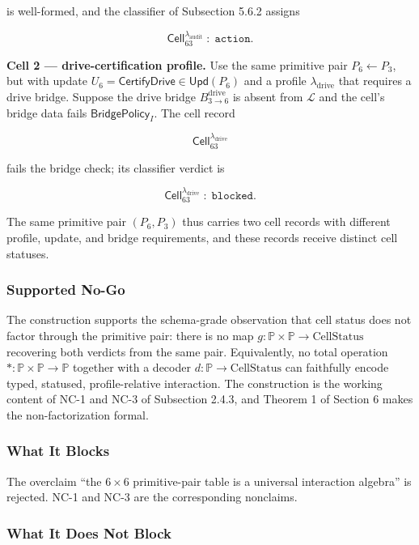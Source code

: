 \documentclass[11pt]{article}
\theoremstyle{definition}
\begin{document}
is well-formed, and the classifier of Subsection 5.6.2 assigns

\[
\mathsf{Cell}_{63}^{\lambda_{\mathrm{audit}}}\;:\;\texttt{action}.
\]

\textbf{Cell 2 --- drive-certification profile.} Use the same primitive pair \(P_6\leftarrow P_3\), but with update \(U_6=\mathsf{CertifyDrive}\in\mathsf{Upd}(P_6)\) and a profile \(\lambda_{\mathrm{drive}}\) that requires a drive bridge. Suppose the drive bridge \(B_{3\to 6}^{\mathrm{drive}}\) is absent from \(\mathcal L\) and the cell's bridge data fails \(\mathsf{BridgePolicy}_I\). The cell record

\[
\mathsf{Cell}_{63}^{\lambda_{\mathrm{drive}}}
\]

fails the bridge check; its classifier verdict is

\[
\mathsf{Cell}_{63}^{\lambda_{\mathrm{drive}}}\;:\;\texttt{blocked}.
\]

The same primitive pair \((P_6,P_3)\) thus carries two cell records with different profile, update, and bridge requirements, and these records receive distinct cell statuses.

\subsubsection{Supported No-Go}

The construction supports the schema-grade observation that cell status does not factor through the primitive pair: there is no map \(g:\mathbb P\times\mathbb P\to\mathrm{CellStatus}\) recovering both verdicts from the same pair. Equivalently, no total operation \(*:\mathbb P\times\mathbb P\to\mathbb P\) together with a decoder \(d:\mathbb P\to\mathrm{CellStatus}\) can faithfully encode typed, statused, profile-relative interaction. The construction is the working content of NC-1 and NC-3 of Subsection 2.4.3, and Theorem 1 of Section 6 makes the non-factorization formal.

\subsubsection{What It Blocks}

The overclaim ``the \(6\times 6\) primitive-pair table is a universal interaction algebra'' is rejected. NC-1 and NC-3 are the corresponding nonclaims.

\subsubsection{What It Does Not Block}
\end{document}
